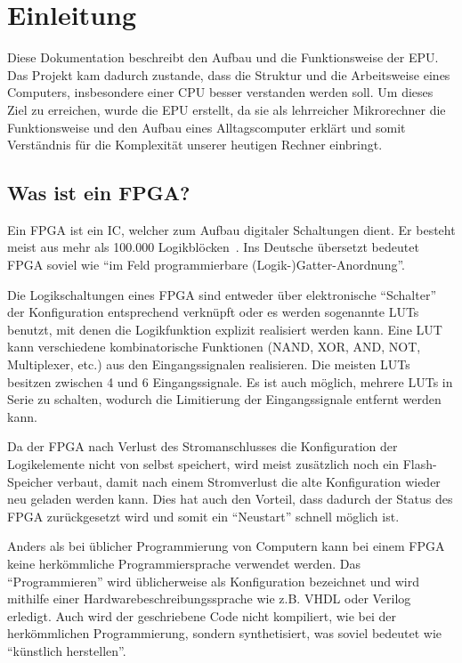 \chapter{Einleitung}
\label{c:einleitung}
Diese Dokumentation beschreibt den Aufbau und die Funktionsweise der \ac{EPU}.
Das Projekt kam dadurch zustande, dass die Struktur und die Arbeitsweise eines
Computers, insbesondere einer \ac{CPU} besser verstanden werden soll. Um dieses
Ziel zu erreichen, wurde die \ac{EPU} erstellt, da sie als lehrreicher
Mikrorechner die Funktionsweise und den Aufbau eines Alltagscomputer erklärt und
somit Verständnis für die Komplexität unserer heutigen Rechner einbringt.

\section{Was ist ein FPGA?}
Ein \ac{FPGA} ist ein \ac{IC}, welcher zum Aufbau digitaler Schaltungen
dient. Er besteht meist aus mehr als 100.000 Logikblöcken~\cite[S. 8]{minicpu}.
Ins Deutsche übersetzt bedeutet \ac{FPGA} soviel wie "`im Feld programmierbare
(Logik-)Gatter-Anordnung"'.

Die Logikschaltungen eines \ac{FPGA} sind entweder über elektronische "`Schalter"'
der Konfiguration entsprechend verknüpft oder es werden sogenannte \acp{LUT}
benutzt, mit denen die Logikfunktion explizit realisiert werden kann. Eine
\ac{LUT} kann verschiedene kombinatorische Funktionen (NAND, XOR, AND, NOT,
Multiplexer, etc.) aus den Eingangssignalen realisieren. Die meisten \acp{LUT}
besitzen zwischen 4 und 6 Eingangssignale. Es ist auch möglich, mehrere
\acp{LUT} in Serie zu schalten, wodurch die Limitierung der Eingangssignale
entfernt werden kann.~\cite{FPGA_Aufbau}

Da der \ac{FPGA} nach Verlust des Stromanschlusses die Konfiguration der
Logikelemente nicht von selbst speichert, wird meist zusätzlich noch ein
Flash-Speicher verbaut, damit nach einem Stromverlust die alte Konfiguration
wieder neu geladen werden kann. Dies hat auch den Vorteil, dass dadurch der
Status des \ac{FPGA} zurückgesetzt wird und somit ein "`Neustart"' schnell möglich
ist.

Anders als bei üblicher Programmierung von Computern kann bei einem \ac{FPGA}
keine herkömmliche Programmiersprache verwendet werden. Das "`Programmieren"' wird
üblicherweise als Konfiguration bezeichnet und wird mithilfe einer
Hardwarebeschreibungssprache wie z.B. VHDL oder Verilog erledigt. Auch wird der
geschriebene Code nicht kompiliert, wie bei der herkömmlichen Programmierung,
sondern synthetisiert, was soviel bedeutet wie "`künstlich herstellen"'.
